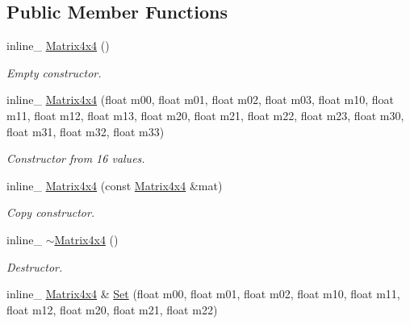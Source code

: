 \subsection*{Public Member Functions}
\begin{DoxyCompactItemize}
\item 
inline\+\_\+ \hyperlink{classOpcode_1_1Matrix4x4_a2b055a527b020187d0556b9c9c3a7609}{Matrix4x4} ()\hypertarget{classOpcode_1_1Matrix4x4_a2b055a527b020187d0556b9c9c3a7609}{}\label{classOpcode_1_1Matrix4x4_a2b055a527b020187d0556b9c9c3a7609}

\begin{DoxyCompactList}\small\item\em Empty constructor. \end{DoxyCompactList}\item 
inline\+\_\+ \hyperlink{classOpcode_1_1Matrix4x4_ad40b02ade09511aea5c3dd0f046a16d9}{Matrix4x4} (float m00, float m01, float m02, float m03, float m10, float m11, float m12, float m13, float m20, float m21, float m22, float m23, float m30, float m31, float m32, float m33)\hypertarget{classOpcode_1_1Matrix4x4_ad40b02ade09511aea5c3dd0f046a16d9}{}\label{classOpcode_1_1Matrix4x4_ad40b02ade09511aea5c3dd0f046a16d9}

\begin{DoxyCompactList}\small\item\em Constructor from 16 values. \end{DoxyCompactList}\item 
inline\+\_\+ \hyperlink{classOpcode_1_1Matrix4x4_ab8dddcc649222cf0f0e6d713591158cb}{Matrix4x4} (const \hyperlink{classOpcode_1_1Matrix4x4}{Matrix4x4} \&mat)\hypertarget{classOpcode_1_1Matrix4x4_ab8dddcc649222cf0f0e6d713591158cb}{}\label{classOpcode_1_1Matrix4x4_ab8dddcc649222cf0f0e6d713591158cb}

\begin{DoxyCompactList}\small\item\em Copy constructor. \end{DoxyCompactList}\item 
inline\+\_\+ \hyperlink{classOpcode_1_1Matrix4x4_ad06bc7add68fe8cf24a5ec76fd57377f}{$\sim$\+Matrix4x4} ()\hypertarget{classOpcode_1_1Matrix4x4_ad06bc7add68fe8cf24a5ec76fd57377f}{}\label{classOpcode_1_1Matrix4x4_ad06bc7add68fe8cf24a5ec76fd57377f}

\begin{DoxyCompactList}\small\item\em Destructor. \end{DoxyCompactList}\item 
inline\+\_\+ \hyperlink{classOpcode_1_1Matrix4x4}{Matrix4x4} \& \hyperlink{classOpcode_1_1Matrix4x4_a895319325aa6677e4d024e69f443c0d4}{Set} (float m00, float m01, float m02, float m10, float m11, float m12, float m20, float m21, float m22)\hypertarget{classOpcode_1_1Matrix4x4_a895319325aa6677e4d024e69f443c0d4}{}\label{classOpcode_1_1Matrix4x4_a895319325aa6677e4d024e69f443c0d4}


\end{DoxyCompactItemize}

